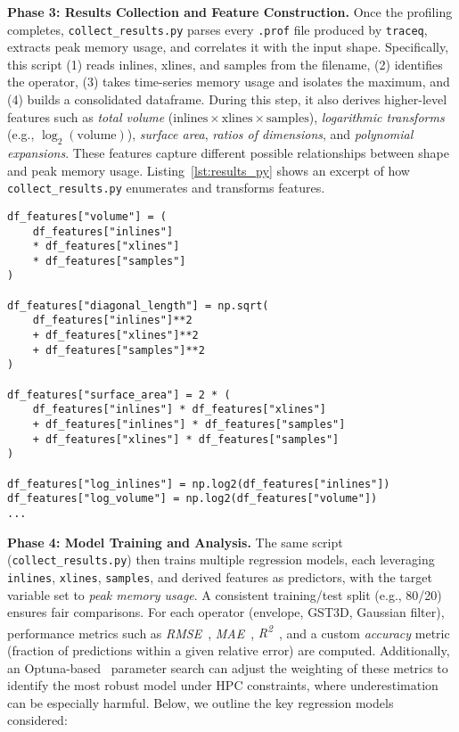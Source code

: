 \vspace{1em}
\noindent
\textbf{Phase 3: Results Collection and Feature Construction.}
Once the profiling completes, \texttt{collect\_results.py} parses every \texttt{.prof} file produced by \texttt{traceq}, extracts peak memory usage, and correlates it with the input shape.
Specifically, this script (1) reads inlines, xlines, and samples from the filename, (2) identifies the operator, (3) takes time-series memory usage and isolates the maximum, and (4) builds a consolidated dataframe.
During this step, it also derives higher-level features such as
\emph{total volume} ($\text{inlines} \times \text{xlines} \times \text{samples}$),
\emph{logarithmic transforms} (e.g., $\log_2(\text{volume})$),
\emph{surface area},
\emph{ratios of dimensions},
and \emph{polynomial expansions}.
These features capture different possible relationships between shape and peak memory usage.
Listing~\ref{lst:results_py} shows an excerpt of how \texttt{collect\_results.py} enumerates and transforms features.

\begin{lstlisting}[style=pythonstyle,
    caption={Feature extraction excerpt from \texttt{collect\_results.py}. Additional derived metrics help capture polynomial or ratio-based growth.},
    label={lst:results_py}]
df_features["volume"] = (
    df_features["inlines"]
    * df_features["xlines"]
    * df_features["samples"]
)

df_features["diagonal_length"] = np.sqrt(
    df_features["inlines"]**2
    + df_features["xlines"]**2
    + df_features["samples"]**2
)

df_features["surface_area"] = 2 * (
    df_features["inlines"] * df_features["xlines"]
    + df_features["inlines"] * df_features["samples"]
    + df_features["xlines"] * df_features["samples"]
)

df_features["log_inlines"] = np.log2(df_features["inlines"])
df_features["log_volume"] = np.log2(df_features["volume"])
...
\end{lstlisting}

\vspace{1em}
\noindent
\textbf{Phase 4: Model Training and Analysis.}
The same script (\texttt{collect\_results.py}) then trains multiple regression models, each leveraging \texttt{inlines}, \texttt{xlines}, \texttt{samples}, and derived features as predictors, with the target variable set to \emph{peak memory usage}.
A consistent training/test split (e.g., 80/20) ensures fair comparisons.
For each operator (envelope, \ac{GST3D}, Gaussian filter), performance metrics such as \textit{\ac{RMSE}}~\cite{hyndman2006}, \textit{\ac{MAE}}~\cite{willmott2005mae}, \textit{R\textsuperscript{2}}~\cite{draper1998applied}, and a custom \emph{accuracy} metric (fraction of predictions within a given relative error) are computed.
Additionally, an Optuna-based~\cite{akiba2019optuna} parameter search can adjust the weighting of these metrics to identify the most robust model under \ac{HPC} constraints, where underestimation can be especially harmful.
Below, we outline the key regression models considered:

